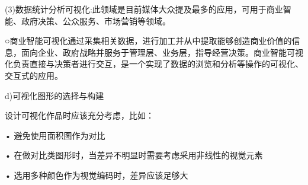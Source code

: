 \documentclass{article}
\begin{document}
\begin{itemize}
      (3)数据统计分析可视化:此领域是目前媒体大众提及最多的应用，可用于商业智能、政府决策、公众服务、市场营销等领域。\par
      ○商业智能可视化通过采集相关数据，进行加工并从中提取能够创造商业价值的信息，面向企业、政府战略并服务于管理层、业务层，指导经营决策。商业智能可视化负责直接与决策者进行交互，是一个实现了数据的浏览和分析等操作的可视化、交互式的应用。\par
    d)可视化图形的选择与构建\par
    设计可视化作品时应该充分考虑，比如：\par
    •	避免使用面积图作为对比\par
    •	在做对比类图形时，当差异不明显时需要考虑采用非线性的视觉元素\par
    •	选用多种颜色作为视觉编码时，差异应该足够大\par
    

\end{itemize}
\end{document}
